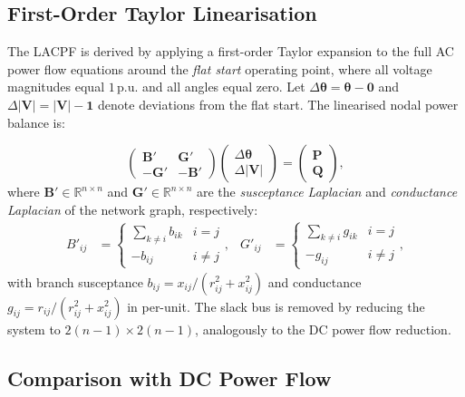 \subsection{First-Order Taylor Linearisation}

The LACPF is derived by applying a first-order Taylor expansion to the full AC power flow equations around the \emph{flat start} operating point, where all voltage magnitudes equal $1\,\text{p.u.}$ and all angles equal zero. Let $\Delta\boldsymbol{\theta} = \boldsymbol{\theta} - \mathbf{0}$ and $\Delta|\mathbf{V}| = |\mathbf{V}| - \mathbf{1}$ denote deviations from the flat start. The linearised nodal power balance is:

\begin{equation}
    \begin{pmatrix} \mathbf{B}' & \mathbf{G}' \\ -\mathbf{G}' & -\mathbf{B}' \end{pmatrix}
    \begin{pmatrix} \Delta\boldsymbol{\theta} \\ \Delta|\mathbf{V}| \end{pmatrix}
    =
    \begin{pmatrix} \mathbf{P} \\ \mathbf{Q} \end{pmatrix},
    \label{eq:lacpf}
\end{equation}
where $\mathbf{B}' \in \mathbb{R}^{n \times n}$ and $\mathbf{G}' \in \mathbb{R}^{n \times n}$ are the \emph{susceptance Laplacian} and \emph{conductance Laplacian} of the network graph, respectively:
\begin{align}
    B'_{ij} &= \begin{cases} \displaystyle\sum_{k \neq i} b_{ik} & i = j \\ -b_{ij} & i \neq j \end{cases},
    &
    G'_{ij} &= \begin{cases} \displaystyle\sum_{k \neq i} g_{ik} & i = j \\ -g_{ij} & i \neq j \end{cases},
    \label{eq:lacpf_BG}
\end{align}
with branch susceptance $b_{ij} = x_{ij}/(r_{ij}^2 + x_{ij}^2)$ and conductance $g_{ij} = r_{ij}/(r_{ij}^2 + x_{ij}^2)$ in per-unit. The slack bus is removed by reducing the system to $2(n-1) \times 2(n-1)$, analogously to the DC power flow reduction.

\subsection{Comparison with DC Power Flow}

